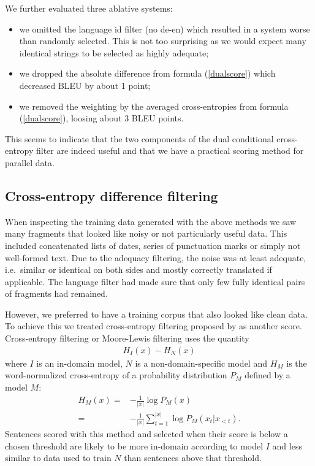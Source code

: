 \documentclass[11pt,a4paper]{article}
\begin{document}
We further evaluated three ablative systems: 
\begin{itemize}
\item we omitted the language id filter (no de-en) which resulted in a system worse than randomly selected. This is not too surprising as we would expect many identical strings to be selected as highly adequate;
\item we dropped the absolute difference from formula (\ref{dualscore}) which decreased BLEU by about 1 point;
\item we removed the weighting by the averaged cross-entropies from formula (\ref{dualscore}), loosing about 3 BLEU points.
\end{itemize}
This seems to indicate that the two components of the dual conditional cross-entropy filter are indeed useful and that we have a practical scoring method for parallel data.

\subsection{Cross-entropy difference filtering}

When inspecting the training data generated with the above methods we saw many fragments that looked like noisy or not particularly useful data. This included concatenated lists of dates, series of punctuation marks or simply not well-formed text. Due to the adequacy filtering, the noise was at least adequate, i.e.~similar or identical on both sides and mostly correctly translated if applicable. The language filter had made sure that only few fully identical pairs of fragments had remained. 

However, we preferred to have a training corpus that also looked like clean data. To achieve this we treated
cross-entropy filtering proposed by  as another score. Cross-entropy filtering or Moore-Lewis filtering uses the quantity
\begin{equation}
\begin{aligned}
H_{I}(x) - H_{N}(x)
\end{aligned}
\end{equation}
where $I$ is an in-domain model, $N$ is a non-domain-specific model and $H_M$ is the word-normalized cross-entropy of a probability distribution $P_M$ defined by a model $M$:
\begin{equation*}
\begin{aligned}
H_M(x) =& -\frac{1}{|x|}\log P_M(x) \\
 =& -\frac{1}{|x|} \sum_{t = 1}^{|x|}\log P_M(x_t|x_{<t}).
\end{aligned}
\end{equation*}
Sentences scored with this method and selected when their score is below a chosen threshold are likely to be more in-domain according to model $I$ and less similar to data used to train $N$ than sentences above that threshold. 
\end{document}
